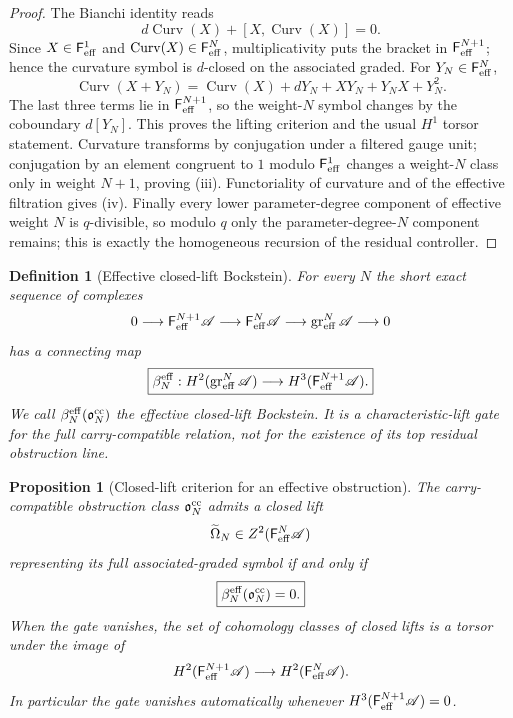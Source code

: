 \documentclass[11pt]{article}
\newtheorem{proposition}[theorem]{Proposition}
\newtheorem{definition}[theorem]{Definition}
\theoremstyle{remark}
\begin{document}
\begin{proof}
The Bianchi identity reads
\[
 d\operatorname{Curv}(X)+[X,\operatorname{Curv}(X)]=0.
\]
Since $X\in\mathsf F_{\rm eff}^{1}$ and
$\operatorname{Curv}(X)\in\mathsf F_{\rm eff}^{N}$, multiplicativity puts the bracket in
$\mathsf F_{\rm eff}^{N+1}$; hence the curvature symbol is $d$-closed on the associated graded.
For $Y_N\in\mathsf F_{\rm eff}^{N}$,
\[
 \operatorname{Curv}(X+Y_N)
 =\operatorname{Curv}(X)+dY_N+XY_N+Y_NX+Y_N^2.
\]
The last three terms lie in $\mathsf F_{\rm eff}^{N+1}$, so the weight-$N$ symbol changes by the
coboundary $d[Y_N]$.  This proves the lifting criterion and the usual $H^1$ torsor statement.
Curvature transforms by conjugation under a filtered gauge unit; conjugation by an element congruent
to $1$ modulo $\mathsf F_{\rm eff}^{1}$ changes a weight-$N$ class only in weight $N+1$, proving
(iii).  Functoriality of curvature and of the effective filtration gives (iv).  Finally every lower
parameter-degree component of effective weight $N$ is $q$-divisible, so modulo $q$ only the
parameter-degree-$N$ component remains; this is exactly the homogeneous recursion of the residual
controller.
\end{proof}

\begin{definition}[Effective closed-lift Bockstein]\label{P1C-def:effective-closed-lift-bockstein}
For every $N$ the short exact sequence of complexes
\[
 0\longrightarrow
 \mathsf F_{\rm eff}^{N+1}\mathscr A
 \longrightarrow
 \mathsf F_{\rm eff}^{N}\mathscr A
 \longrightarrow
 \operatorname{gr}^{N}_{\rm eff}\mathscr A
 \longrightarrow0
\]
has a connecting map
\begin{equation}\label{P1C-eq:effective-closed-lift-bockstein}
 \boxed{
 \beta_N^{\rm eff}:
 H^2(\operatorname{gr}^{N}_{\rm eff}\mathscr A)
 \longrightarrow
 H^3(\mathsf F_{\rm eff}^{N+1}\mathscr A).}
\end{equation}
We call $\beta_N^{\rm eff}(\mathfrak o_N^{\rm cc})$ the \emph{effective closed-lift
Bockstein}.  It is a characteristic-lift gate for the full carry-compatible relation, not for the
existence of its top residual obstruction line.
\end{definition}

\begin{proposition}[Closed-lift criterion for an effective obstruction]
\label{P1C-prop:effective-closed-lift-criterion}
The carry-compatible obstruction class $\mathfrak o_N^{\rm cc}$ admits a closed lift
\[
 \widetilde\Omega_N\in
 Z^2(\mathsf F_{\rm eff}^{N}\mathscr A)
\]
representing its full associated-graded symbol if and only if
\[
 \boxed{\beta_N^{\rm eff}(\mathfrak o_N^{\rm cc})=0.}
\]
When the gate vanishes, the set of cohomology classes of closed lifts is a torsor under the image of
\[
 H^2(\mathsf F_{\rm eff}^{N+1}\mathscr A)
 \longrightarrow
 H^2(\mathsf F_{\rm eff}^{N}\mathscr A).
\]
In particular the gate vanishes automatically whenever
$H^3(\mathsf F_{\rm eff}^{N+1}\mathscr A)=0$.
\end{proposition}
\end{document}
